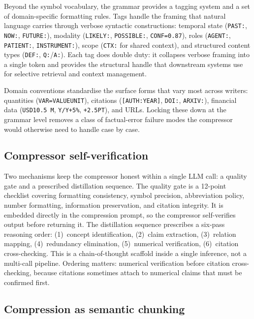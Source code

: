 \documentclass{article}
\begin{document}
Beyond the symbol vocabulary, the grammar provides a tagging system and a set of domain-specific formatting rules. Tags handle the framing that natural language carries through verbose syntactic constructions: temporal state (\texttt{PAST:}, \texttt{NOW:}, \texttt{FUTURE:}), modality (\texttt{LIKELY:}, \texttt{POSSIBLE:}, \texttt{CONF=0.87}), roles (\texttt{AGENT:}, \texttt{PATIENT:}, \texttt{INSTRUMENT:}), scope (\texttt{CTX:} for shared context), and structured content types (\texttt{DEF:}, \texttt{Q:}/\texttt{A:}). Each tag does double duty: it collapses verbose framing into a single token and provides the structural handle that downstream systems use for selective retrieval and context management.

Domain conventions standardise the surface forms that vary most across writers: quantities (\texttt{VAR=VALUEUNIT}), citations (\texttt{[AUTH:YEAR]}, \texttt{DOI:}, \texttt{ARXIV:}), financial data (\texttt{USD10.5\,M}, \texttt{Y/Y+5\%}, \texttt{+2.5PT}), and URLs. Locking these down at the grammar level removes a class of factual-error failure modes the compressor would otherwise need to handle case by case.

\subsection{Compressor self-verification}

Two mechanisms keep the compressor honest within a single LLM call: a quality gate and a prescribed distillation sequence. The quality gate is a 12-point checklist covering formatting consistency, symbol precision, abbreviation policy, number formatting, information preservation, and citation integrity. It is embedded directly in the compression prompt, so the compressor self-verifies output before returning it. The distillation sequence prescribes a six-pass reasoning order: (1)~concept identification, (2)~claim extraction, (3)~relation mapping, (4)~redundancy elimination, (5)~numerical verification, (6)~citation cross-checking. This is a chain-of-thought scaffold inside a single inference, not a multi-call pipeline. Ordering matters: numerical verification before citation cross-checking, because citations sometimes attach to numerical claims that must be confirmed first.

\subsection{Compression as semantic chunking}
\end{document}

